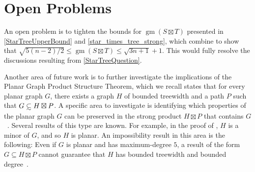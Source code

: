 \documentclass{patmorin}
\newcommand{\boxprod}{\mathbin{\Box}}
\renewcommand{\le}{\leqslant}
\DeclareMathOperator{\gm}{gm}
\theoremstyle{plain}
\theoremstyle{definition}
\let\oldsubset\subset
\newcommand{\subsetsim}{\mathrel{\ooalign{\raise0.175ex\hbox{$\oldsubset$}\cr\hidewidth\raise-0.9ex\hbox{\scalebox{0.9}{$\sim$}}\hidewidth\cr}}}
\begin{document}
\section{Open Problems}\label{E}


An open problem is to tighten the bounds for $\gm(S\boxtimes T)$ presented in \cref{StarTreeUpperBound} and \cref{star_times_tree_strong}, which combine to show that $\sqrt{5(n-2)/2} \le \gm(S\boxtimes T) \le \sqrt{3n+1}+1$.
This would fully resolve the discussions resulting from \eqref{StarTreeQuestion}.

Another area of future work is to further investigate the implications of the Planar Graph Product Structure Theorem, which we recall states that for every planar graph $G$, there exists a graph $H$ of bounded treewidth and a path $P$ such that $G \subsetsim H \boxtimes P$. A specific area to investigate is identifying which properties of the planar graph $G$ can be preserved in the strong product $H\boxtimes P$ that contains $G$~\cite{DJMMUW20}.   Several results of this type are known. For example, in the proof of \citet{DJMMUW20}, $H$ is a minor of $G$, and so $H$ is planar. An impossibility result in this area is the following: Even if $G$ is planar and has maximum-degree $5$, a result of the form $G\subseteq H\boxtimes P$ cannot guarantee that $H$ has bounded treewidth and bounded degree~\cite{DJMMW22}.  
\end{document}
